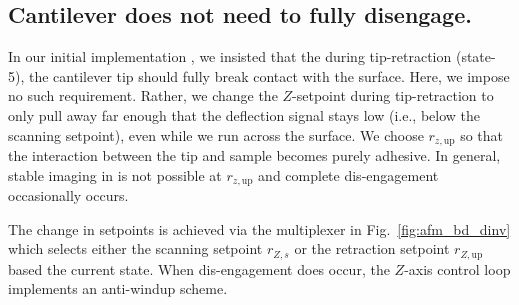 \documentclass[twocolumn,oneside]{IEEEtran/IEEEtran}
\newcommand{\rzup}{\ensuremath{r_{z,\textrm{up}}}\xspace}
\begin{document}
\subsection{Cantilever does not need to fully disengage.}
In our initial implementation \cite{braker_hardware_2018}, we insisted that the during tip-retraction
(state-5), the cantilever tip should fully break contact with the surface. Here,
we impose no such requirement. Rather, we change the $Z$-setpoint during
tip-retraction to only pull away far enough that the deflection signal stays low
(i.e., below the scanning setpoint), even while we run across the surface. We choose \rzup so that the interaction between the tip and sample becomes purely adhesive. In general, stable imaging in is not possible at \rzup and complete dis-engagement occasionally occurs.


The change in setpoints is achieved via the multiplexer in Fig.~\ref{fig:afm_bd_dinv}
which selects either the scanning setpoint $r_{Z,s}$ or the retraction setpoint
$r_{Z,\textrm{up}}$ based the current state.
When dis-engagement does occur, the $Z$-axis control loop implements an anti-windup scheme.



\end{document}
